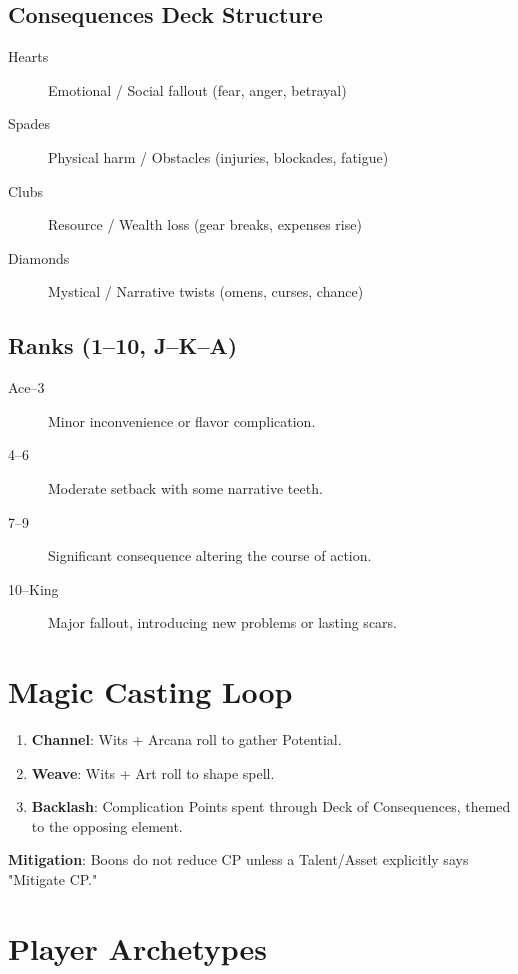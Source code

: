 \subsection{Consequences Deck Structure}

\begin{description}
\item[Hearts] Emotional / Social fallout (fear, anger, betrayal)
\item[Spades] Physical harm / Obstacles (injuries, blockades, fatigue)
\item[Clubs] Resource / Wealth loss (gear breaks, expenses rise)
\item[Diamonds] Mystical / Narrative twists (omens, curses, chance)
\end{description}

\subsection{Ranks (1--10, J--K--A)}

\begin{description}
\item[Ace--3] Minor inconvenience or flavor complication.
\item[4--6] Moderate setback with some narrative teeth.
\item[7--9] Significant consequence altering the course of action.
\item[10--King] Major fallout, introducing new problems or lasting scars.
\end{description}

\section{Magic Casting Loop}

\begin{enumerate}
\item \textbf{Channel}: Wits + Arcana roll to gather Potential.
\item \textbf{Weave}: Wits + Art roll to shape spell.
\item \textbf{Backlash}: Complication Points spent through Deck of Consequences, themed to the opposing element.
\end{enumerate}

\textbf{Mitigation}: Boons do not reduce CP unless a Talent/Asset explicitly says "Mitigate CP."

\section{Player Archetypes}

